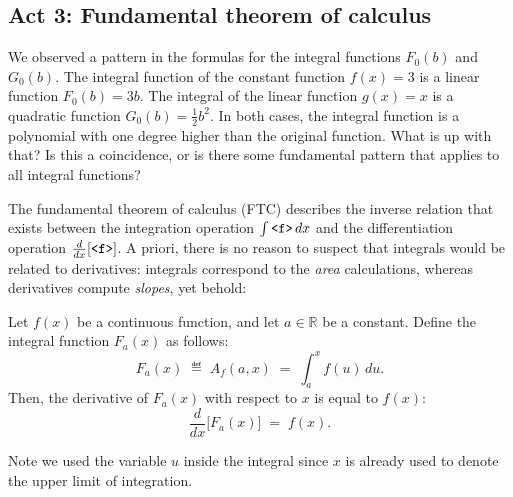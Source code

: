 
	\subsection{Act 3: Fundamental theorem of calculus}

		We observed a pattern in the formulas for the integral functions $F_0(b)$ and $G_0(b)$.
		The integral function of the constant function $f(x)=3$
		is a linear function $F_0(b) = 3b$.
		The integral of the linear function $g(x) = x$
		is a quadratic function $G_0(b) = \frac{1}{2}b^2$.
		In both cases,
		the integral function is a polynomial with one degree higher than the original function.
		What is up with that?
		Is this a coincidence,
		or is there some fundamental pattern that applies to all integral functions?

		The fundamental theorem of calculus (FTC)
		describes the inverse relation that exists between
		the integration operation $\int \tt{<f>}\,dx$
		and the differentiation operation $\frac{d}{dx}[\tt{<f>}]$.
		A priori,
		there is no reason to suspect that integrals would be related to derivatives:
		integrals correspond to the \emph{area} calculations,
		whereas derivatives compute \emph{slopes},
		yet behold:

		\begin{shadetheorem}
			Let $f(x)$  be a continuous function,
			and let $a \in \mathbb{R}$ be a constant.
			Define the integral function $F_a(x)$ as follows:
			\[
				F_a(x)  \; \eqdef \; A_f(a, x) \; = \; \int_a^x f(u) \, du.
			\]
			Then,
			the derivative of $F_a(x)$ with respect to $x$ is equal to $f(x)$:
			\[
				\frac{d}{dx}\!\big[F_a(x)\big] \; = \; f(x).
			\]
		\end{shadetheorem}
		\vspace{-2mm}

		\noindent
		Note we used the variable $u$ inside the integral
		since $x$ is already used to denote the upper limit of integration.


